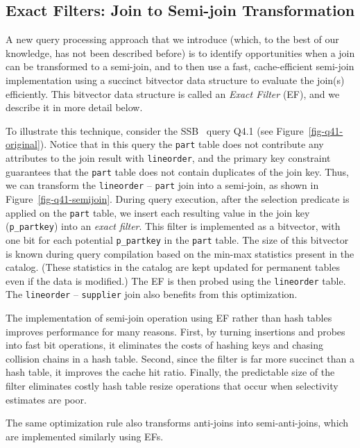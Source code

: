 \subsection{Exact Filters: Join to Semi-join Transformation} \label{sec:ef}
A new query processing approach that we introduce (which, to the best of our knowledge, has not been described before) is to identify opportunities when a join can be transformed to a semi-join, and to then use a  fast, cache-efficient semi-join implementation using a succinct bitvector data structure to evaluate the join(s) efficiently. This bitvector data structure is called an \textit{Exact Filter} (EF), and we describe it in more detail below.



To illustrate this technique, consider the SSB~\cite{ssb} query Q4.1 (see Figure~\ref{fig-q41-original}). Notice that in this query the \texttt{part} table does not contribute any attributes to the join result with \texttt{lineorder}, and the primary key constraint guarantees that the \texttt{part} table does not contain duplicates of the join key. Thus, we can transform the \texttt{lineorder} -- \texttt{part} join into a semi-join, as shown in Figure~\ref{fig-q41-semijoin}. During query execution, after the selection predicate is applied on the \texttt{part} table, we insert each resulting value in the join key (\texttt{p\_partkey}) into an \textit{exact filter}. This filter is implemented as a bitvector, with one bit for each potential \texttt{p\_partkey} in the  \texttt{part} table. The size of this bitvector is known during query compilation based on the min-max statistics present in the catalog. (These statistics in the catalog are  kept updated for permanent tables even if the data is modified.) The EF is then probed using the \texttt{lineorder} table. The \texttt{lineorder} -- \texttt{supplier} join also benefits from this optimization.

The implementation of semi-join operation using EF rather than hash tables improves performance for many reasons. First, by turning insertions and probes into fast bit operations, it eliminates the costs of hashing keys and chasing collision chains in a hash table. Second, since the filter is far more succinct than a hash table, it improves the cache hit ratio. Finally, the predictable size of the filter eliminates costly hash table resize operations that occur when selectivity estimates are poor.

The same optimization rule also transforms anti-joins into semi-anti-joins, which are implemented similarly using EFs.


